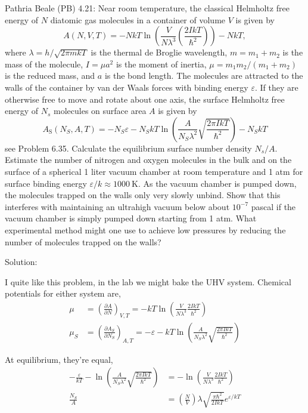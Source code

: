 \newpage
\begin{homeworkProblem}
    Pathria Beale (PB) 4.21: Near room temperature, the classical Helmholtz free energy of $N$ diatomic gas molecules in a container of volume $V$ is given by
$$
A(N, V, T)=-N k T \ln \left(\frac{V}{N \lambda^3}\left(\frac{2 I k T}{\hbar^2}\right)\right)-N k T,
$$
where $\lambda=h / \sqrt{2 \pi m k T}$ is the thermal de Broglie wavelength, $m=m_1+m_2$ is the mass of the molecule, $I=\mu a^2$ is the moment of inertia, $\mu=m_1 m_2 /\left(m_1+m_2\right)$ is the reduced mass, and $a$ is the bond length. The molecules are attracted to the walls of the container by van der Waals forces with binding energy $\varepsilon$. If they are otherwise free to move and rotate about one axis, the surface Helmholtz free energy of $N_s$ molecules on surface area $A$ is given by
$$
A_{\mathrm{S}}\left(N_S, A, T\right)=-N_S \varepsilon-N_S k T \ln \left(\frac{A}{N_S \lambda^2} \sqrt{\frac{2 \pi I k T}{\hbar^2}}\right)-N_S k T
$$
see Problem 6.35. Calculate the equilibrium surface number density $N_s / A$. Estimate the number of nitrogen and oxygen molecules in the bulk and on the surface of a spherical 1 liter vacuum chamber at room temperature and 1 atm for surface binding energy $\varepsilon / k \approx 1000 \mathrm{~K}$. As the vacuum chamber is pumped down, the molecules trapped on the walls only very slowly unbind. Show that this interferes with maintaining an ultrahigh vacuum below about $10^{-7}$ pascal if the vacuum chamber is simply pumped down starting from 1 atm. What experimental method might one use to achieve low pressures by reducing the number of molecules trapped on the walls?
\begin{callout}{Solution:}

I quite like this problem, in the lab we might bake the UHV system. Chemical potentials for either system are, 
\begin{align*}
    \mu &= \left(\frac{\partial A}{\partial N}\right)_{V,T} = -kT \ln \left(\frac{V}{N \lambda^3} \frac{2 I k T}{\hbar^2}\right) \\ 
    \mu_S &= \left(\frac{\partial A_S}{\partial N_S}\right)_{A,T} = -\varepsilon - kT \ln \left(\frac{A}{N_S \lambda^2} \sqrt{\frac{2 \pi I k T}{\hbar^2}}\right)
\end{align*}

At equilibrium, they're equal, 
\begin{align*}
    -\frac{\varepsilon}{kT} - \ln\left(\frac{A}{N_S \lambda^2} \sqrt{\frac{2 \pi I k T}{\hbar^2}}\right) &= -\ln\left(\frac{V}{N \lambda^3} \frac{2 I k T}{\hbar^2}\right) \\
\frac{N_S}{A} &= \left(\frac{N}{V}\right) \lambda \sqrt{\frac{\pi \hbar^2}{2 I k T}} e^{\varepsilon / kT}
\end{align*}


\end{callout}
\end{homeworkProblem}
